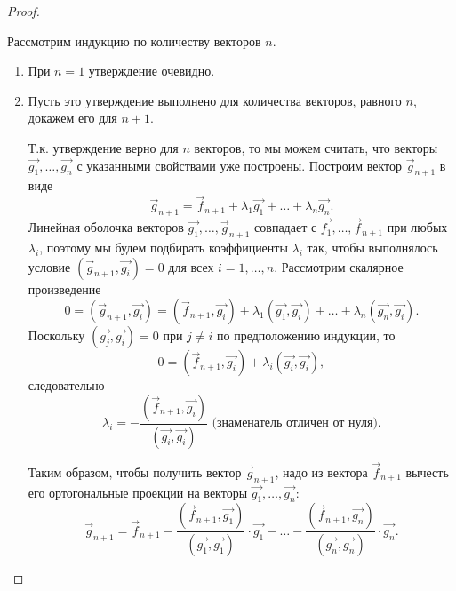\begin{proof}~

    Рассмотрим индукцию по количеству векторов $n$.
    \begin{enumerate}
        \item При $n = 1$ утверждение очевидно.
        \item Пусть это утверждение выполнено для количества векторов, равного $n$, докажем его для $n + 1$. 
        
        Т.к. утверждение верно для $n$ векторов, то мы можем считать, что векторы $\vec{g_1}, \ldots, \vec{g_n}$ с указанными свойствами уже построены. Построим вектор $\vec{g}_{n + 1}$ в виде 
        $$\vec{g}_{n + 1} = \vec{f}_{n + 1} + \lambda_1 \vec{g_1} + \ldots + \lambda_n\vec{g_n}.$$ 
        Линейная оболочка векторов $\vec{g_1}, \ldots,  \vec{g}_{n + 1}$ совпадает с $\vec{f_1}, \ldots, \vec{f}_{n + 1}$ при любых $\lambda_i$, поэтому мы будем подбирать коэффициенты $\lambda_i$ так, чтобы выполнялось условие $(\vec{g}_{n + 1},  \vec{g_i}) = 0$ для всех $i = 1, \ldots, n$. Рассмотрим скалярное произведение $$0 = (\vec{g}_{n + 1}, \vec{g_i}) = (\vec{f}_{n + 1}, \vec{g_i})+ \lambda_1(\vec{g_1}, \vec{g_i}) + \ldots + \lambda_n(\vec{g_n}, \vec{g_i}).$$
        Поскольку $(\vec{g_j}, \vec{g_i}) = 0$ при $j \ne i$ по предположению индукции, то 
        $$0 = (\vec{f}_{n + 1}, \vec{g_i}) + \lambda_i(\vec{g_i}, \vec{g_i}),$$ следовательно 
        $$\lambda_i = -\frac{(\vec{f}_{n + 1}, \vec{g_i})}{(\vec{g_i}, \vec{g_i})} \text{ (знаменатель отличен от нуля).}$$ 
        
        Таким образом, чтобы получить вектор $\vec{g}_{n + 1}$, надо из вектора $\vec{f}_{n + 1}$ вычесть его ортогональные проекции на векторы $\vec{g_1}, \ldots, \vec{g_n}$:
        $$\vec{g}_{n + 1} = \vec{f}_{n + 1} -\frac{(\vec{f}_{n + 1}, \vec{g_1})}{(\vec{g_1}, \vec{g_1})} \cdot \vec{g_1} - \ldots -\frac{(\vec{f}_{n + 1}, \vec{g_n})}{(\vec{g_n}, \vec{g_n})} \cdot \vec{g_n}.$$
    \end{enumerate}
\end{proof}
